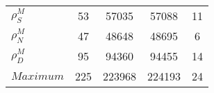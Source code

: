 \begin{center}
\begin{longtable}{lcccc}
$ {\rho^{M}_{S}}       $	 & 	                   53	 & 	                57035	 & 	                57088	 & 	                   11 \\ 
$ {\rho^{M}_{N}}       $	 & 	                   47	 & 	                48648	 & 	                48695	 & 	                    6 \\ 
$ {\rho^{M}_{D}}       $	 & 	                   95	 & 	                94360	 & 	                94455	 & 	                   14 \\ 
$Maximum               $	 & 	                  225	 & 	               223968	 & 	               224193	 & 	                   24 \\ 
\end{longtable}
 \end{center}
